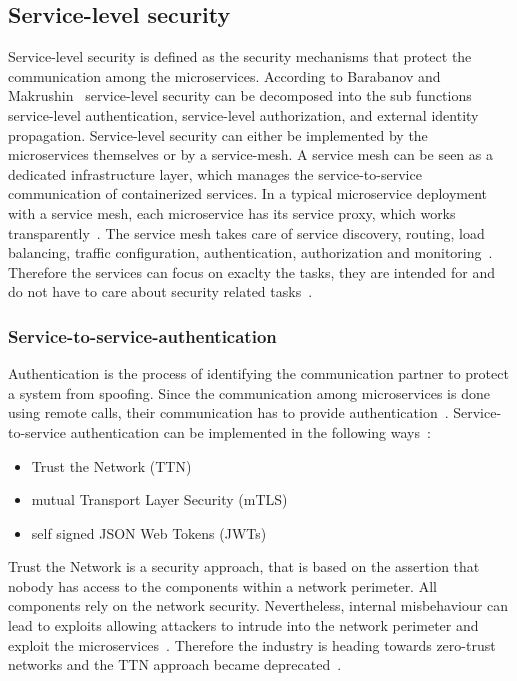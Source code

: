 \subsection{Service-level security}
Service-level security is defined as the security mechanisms that protect the communication among the microservices.
According to Barabanov and Makrushin~\cite{barabanov2020authentication} service-level security can be decomposed into the sub functions service-level authentication, service-level authorization, and external identity propagation.
Service-level security can either be implemented by the microservices themselves or by a service-mesh.
A service mesh can be seen as a dedicated infrastructure layer, which manages the service-to-service communication of containerized services.
In a typical microservice deployment with a service mesh, each microservice has its service proxy, which works transparently~\cite{dias2020microservices}.
The service mesh takes care of service discovery, routing, load balancing, traffic configuration, authentication, authorization and monitoring~\cite{chandramouli2019microservices}.
Therefore the services can focus on exaclty the tasks, they are intended for and do not have to care about security related tasks~\cite{dias2020microservices}.

\subsubsection{Service-to-service-authentication} 
\label{sec:service-to-service-authentication}
Authentication is the process of identifying the communication partner to protect a system from spoofing.
Since the communication among microservices is done using remote calls, their communication has to provide authentication~\cite{dias2020microservices}.
Service-to-service authentication can be implemented in the following ways~\cite{dias2020microservices}:
\begin{itemize}
    \item Trust the Network (TTN)
    \item mutual Transport Layer Security (mTLS)
    \item self signed JSON Web Tokens (JWTs)
\end{itemize}
Trust the Network is a security approach, that is based on the assertion that nobody has access to the components within a network perimeter.
All components rely on the network security.
Nevertheless, internal misbehaviour can lead to exploits allowing attackers to intrude into the network perimeter and exploit the microservices~\cite{zaheer2019eztrust}. 
Therefore the industry is heading towards zero-trust networks and the TTN approach became deprecated~\cite{dias2020microservices}.

